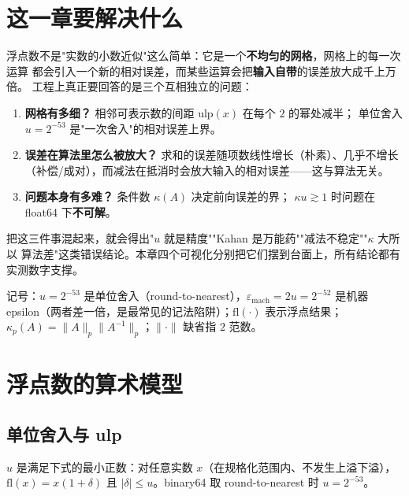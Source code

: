 

\section{这一章要解决什么}

浮点数不是"实数的小数近似"这么简单：它是一个\textbf{不均匀的网格}，网格上的每一次运算
都会引入一个新的相对误差，而某些运算会把\textbf{输入自带}的误差放大成千上万倍。
工程上真正要回答的是三个互相独立的问题：

\begin{enumerate}
  \item \textbf{网格有多细？} 相邻可表示数的间距 $\mathrm{ulp}(x)$ 在每个 $2$ 的幂处减半；
        单位舍入 $u=2^{-53}$ 是"一次舍入"的相对误差上界。
  \item \textbf{误差在算法里怎么被放大？} 求和的误差随项数线性增长（朴素）、几乎不增长
        （补偿/成对），而减法在抵消时会放大输入的相对误差——这与算法无关。
  \item \textbf{问题本身有多难？} 条件数 $\kappa(A)$ 决定前向误差的界；
        $\kappa u\gtrsim1$ 时问题在 float64 下\textbf{不可解}。
\end{enumerate}

把这三件事混起来，就会得出"$u$ 就是精度""Kahan 是万能药""减法不稳定""$\kappa$ 大所以
算法差"这类错误结论。本章四个可视化分别把它们摆到台面上，所有结论都有实测数字支撑。

记号：$u=2^{-53}$ 是单位舍入（round-to-nearest），$\varepsilon_{\text{mach}}=2u=2^{-52}$
是机器 epsilon（两者差一倍，是最常见的记法陷阱）；$\mathrm{fl}(\cdot)$ 表示浮点结果；
$\kappa_p(A)=\|A\|_p\|A^{-1}\|_p$；$\|\cdot\|$ 缺省指 $2$ 范数。

\section{浮点数的算术模型}

\subsection{单位舍入与 ulp}

\begin{definition}[单位舍入]
$u$ 是满足下式的最小正数：对任意实数 $x$（在规格化范围内、不发生上溢下溢），
$\mathrm{fl}(x)=x(1+\delta)$ 且 $|\delta|\le u$。binary64 取 round-to-nearest 时 $u=2^{-53}$。
\end{definition}

